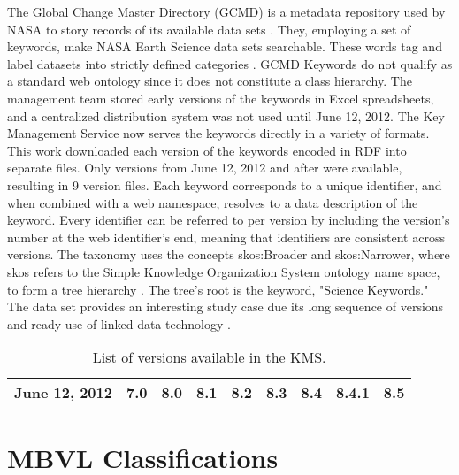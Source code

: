 The Global Change Master Directory (GCMD) is a metadata repository used by NASA to story records of its available data sets \cite{Miled:2001:GCM:372202.372324}.
They, employing a set of keywords, make NASA Earth Science data sets searchable.
These words tag and label datasets into strictly defined categories \cite{GCMDKey}.
GCMD Keywords do not qualify as a standard web ontology since it does not constitute a class hierarchy.
The management team stored early versions of the keywords in Excel spreadsheets, and a centralized distribution system was not used until June 12, 2012.
The Key Management Service now serves the keywords directly in a variety of formats.
This work downloaded each version of the keywords encoded in RDF into separate files.
Only versions from June 12, 2012 and after were available, resulting in 9 version files.
Each keyword corresponds to a unique identifier, and when combined with a web namespace, resolves to a data description of the keyword.
Every identifier can be referred to per version by including the version's number at the web identifier's end, meaning that identifiers are consistent across versions.
The taxonomy uses the concepts skos:Broader and skos:Narrower, where skos refers to the Simple Knowledge Organization System ontology name space, to form a tree hierarchy \cite{skos}.
The tree's root is the keyword, "Science Keywords."
The data set provides an interesting study case due its long sequence of versions and ready use of linked data technology \cite{Stevens2016}.

\begin{table}
	\caption{List of versions available in the KMS.}
	\label{gcmd_table}
	\centering
	\begin{tabular}{|c|c|c|c|c|c|c|c|c|}
		\hline
		June 12, 2012 & 7.0 & 8.0 & 8.1 & 8.2 & 8.3 & 8.4 & 8.4.1 & 8.5 \\
		\hline
	\end{tabular}
\end{table}

\section{MBVL Classifications} \label{sec:MBVL}

